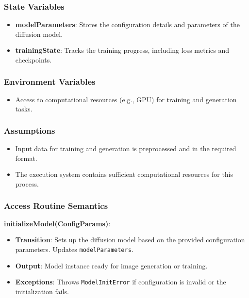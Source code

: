\documentclass[12pt, titlepage]{article}
\begin{document}
\subsubsection{State Variables}
\begin{itemize}
    \item \textbf{modelParameters}: Stores the configuration details and parameters of the diffusion model.
    \item \textbf{trainingState}: Tracks the training progress, including loss metrics and checkpoints.
\end{itemize}

\subsubsection{Environment Variables}
\begin{itemize}
    \item Access to computational resources (e.g., GPU) for training and generation tasks.
\end{itemize}

\subsubsection{Assumptions}
\begin{itemize}
    \item Input data for training and generation is preprocessed and in the required format.
    \item The execution system contains sufficient computational resources for this process.
\end{itemize}

\subsubsection{Access Routine Semantics}

\textbf{initializeModel(ConfigParams)}:
\begin{itemize}
    \item \textbf{Transition}: Sets up the diffusion model based on the provided configuration parameters. Updates \texttt{modelParameters}.
    \item \textbf{Output}: Model instance ready for image generation or training.
    \item \textbf{Exceptions}: Throws \texttt{ModelInitError} if configuration is invalid or the initialization fails.
\end{itemize}
\end{document}
